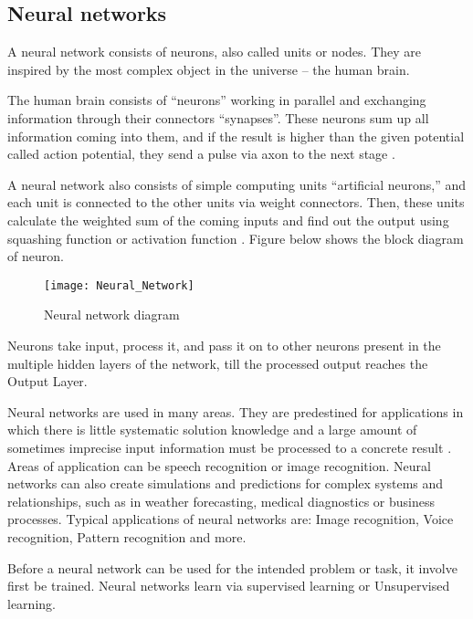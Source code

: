 
\subsection{Neural networks} %
\label{sub: Neural_networks}

A neural network consists of neurons, also called units or nodes.  They are inspired by the most complex object in the universe – the human brain.

The human brain consists of  “neurons” working in parallel and exchanging information through their connectors “synapses”.  These neurons sum up all information coming into them, and if the result is higher than the given potential called action potential, they send a pulse via axon to the next stage \cite{dspguide}.

A neural network also consists of simple computing units “artificial neurons,” and each unit is connected to the other units via weight connectors. Then, these units calculate the weighted sum of the coming inputs and find out the output using squashing function or activation function \cite{inbook}. Figure below shows the block diagram of neuron.

\begin{figure}[ht]
	\centering
	\texttt{[image: Neural\_Network]}
	  \caption{Neural network diagram}
  \label{fig:Neural_Network}
\end{figure}

Neurons take input, process it, and pass it on to other neurons present in the multiple hidden layers \cite{inbook} of the network, till the processed output reaches the Output Layer.

Neural networks are used in many areas. They are predestined for applications in which there is little systematic solution knowledge and a large amount of sometimes imprecise input information must be processed to a concrete result \cite{article_Mijwil}. Areas of application can be speech recognition or image recognition. Neural networks can also create simulations and predictions for complex systems and relationships, such as in weather forecasting, medical diagnostics or business processes. Typical applications of neural networks are: Image recognition, Voice recognition, Pattern recognition and more.

Before a neural network can be used for the intended problem or task, it involve first be trained. Neural networks learn via supervised learning or Unsupervised learning. 

